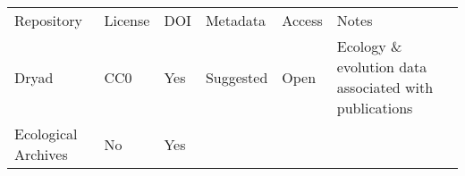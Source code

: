 \begin{longtable}[c]{@{}llllll@{}}
\toprule\addlinespace
\begin{minipage}[b]{0.16\columnwidth}\raggedright
Repository
\end{minipage} & \begin{minipage}[b]{0.09\columnwidth}\raggedright
License
\end{minipage} & \begin{minipage}[b]{0.07\columnwidth}\raggedright
DOI
\end{minipage} & \begin{minipage}[b]{0.12\columnwidth}\raggedright
Metadata
\end{minipage} & \begin{minipage}[b]{0.10\columnwidth}\raggedright
Access
\end{minipage} & \begin{minipage}[b]{0.15\columnwidth}\raggedright
Notes
\end{minipage}
\\\addlinespace
\midrule\endhead
\begin{minipage}[t]{0.16\columnwidth}\raggedright
Dryad
\end{minipage} & \begin{minipage}[t]{0.09\columnwidth}\raggedright
CC0
\end{minipage} & \begin{minipage}[t]{0.07\columnwidth}\raggedright
Yes
\end{minipage} & \begin{minipage}[t]{0.12\columnwidth}\raggedright
Suggested
\end{minipage} & \begin{minipage}[t]{0.10\columnwidth}\raggedright
Open
\end{minipage} & \begin{minipage}[t]{0.15\columnwidth}\raggedright
Ecology \& evolution data associated with publications
\end{minipage}
\\\addlinespace
\begin{minipage}[t]{0.16\columnwidth}\raggedright
Ecological Archives
\end{minipage} & \begin{minipage}[t]{0.09\columnwidth}\raggedright
No
\end{minipage} & \begin{minipage}[t]{0.07\columnwidth}\raggedright
Yes
\end{minipage} & \begin{minipage}[t]{0.12\columnwidth}\raggedright

\end{minipage}
\end{longtable}
